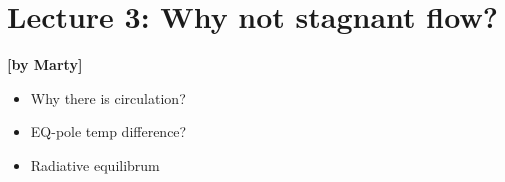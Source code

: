 
\section{Lecture 3: Why not stagnant flow?}\label{sec:lecture2}
\begin{flushright}\textbf{[by Marty]}\end{flushright}
  
 \begin{itemize}
   \item
   Why there is circulation?
   \item
   EQ-pole temp difference? 
   \item
   Radiative equilibrum
\end{itemize}
